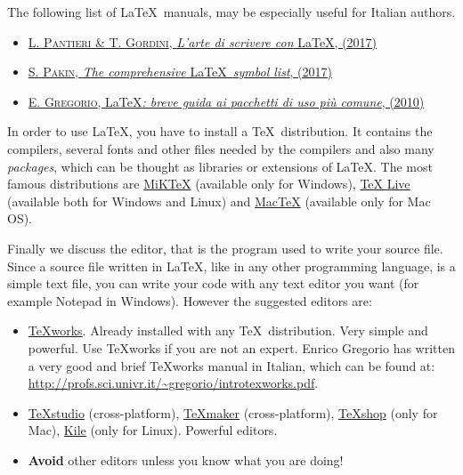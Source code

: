 \documentclass[a5paper,11pt]{article}
\begin{document}
The following list of \LaTeX\ manuals, may be especially useful for Italian authors.

\begin{itemize}
\item \href{http://www.lorenzopantieri.net/LaTeX_files/ArteLaTeX.pdf}{\textsc{L. 
Pantieri \& T. Gordini}, \textit{L'arte di scrivere con} \LaTeX, (2017)}

\item \href{http://mirror.ctan.org/info/symbols/comprehensive/symbols-a4.pdf}{\textsc{S. Pakin}, \textit{The comprehensive} \LaTeX\ \textit{symbol list}, (2017)}

\item \href{http://profs.sci.univr.it/~gregorio/breveguida.pdf}{\textsc{E. Gregorio}, \LaTeX\textit{: breve guida ai pacchetti di uso pi\`u comune}, (2010)}
\end{itemize}

In order to use \LaTeX, you have to install a \TeX\ distribution. It contains the compilers, several fonts and other files needed by the compilers and also many \emph{packages}, which can be thought as libraries or extensions of \LaTeX. The most famous distributions are \href{http://miktex.org/}{MiKTeX} (available only for Windows), \href{http://www.tug.org/texlive/}{TeX Live} (available both for Windows and Linux) and \href{http://www.tug.org/mactex/2011/}{MacTeX} (available only for Mac OS).

Finally we discuss the editor, that is the program used to write your source file. Since a source file written in \LaTeX, like in any other programming language, is a simple text file, you can write your code with any text editor you want (for example Notepad in Windows). However the suggested editors are:
\begin{itemize}
\item \href{http://tug.org/texworks/}{TeXworks}. Already installed with any \TeX\ distribution. Very simple and powerful. Use TeXworks if you are not an expert. Enrico Gregorio has written a very good and brief TeXworks manual in Italian, which can be found at: {\small \url{http://profs.sci.univr.it/~gregorio/introtexworks.pdf}}.

\item \href{http://texstudio.sourceforge.net/}{TeXstudio} (cross-platform), \href{http://www.xm1math.net/texmaker/}{TeXmaker} (cross-platform), \href{http://pages.uoregon.edu/koch/texshop/}{TeXshop} (only for Mac), \href{http://kile.sourceforge.net/}{Kile} (only for Linux). Powerful editors.

\item \textbf{Avoid} other editors unless you know what you are doing!

\end{itemize}
\end{document}

